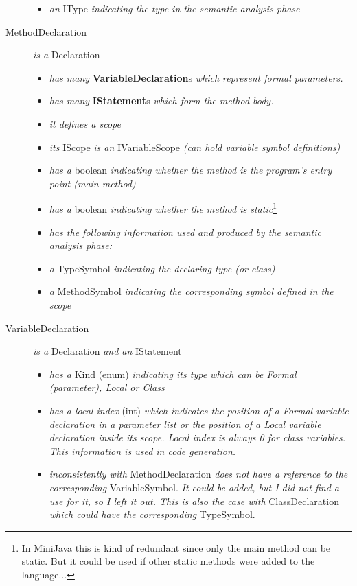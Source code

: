 \documentclass[a4paper,11pt]{article}
\begin{document}
\begin{description}
\begin{itemize}
        \item \emph{an} IType \emph{indicating the type in the semantic analysis phase}
      \end{itemize}
    \item[MethodDeclaration] \emph{is a} Declaration
      \begin{itemize}
        \item \emph{has many} \textbf{VariableDeclaration}s \emph{which represent formal parameters.}
        \item \emph{has many} \textbf{IStatement}s \emph{which form the method body.}
        \item \emph{it defines a scope}
        \item \emph{its} IScope \emph{is an} IVariableScope \emph{(can hold variable symbol definitions)}
        \item \emph{has a} boolean \emph{indicating whether the method is the program's entry point (main method)}
        \item \emph{has a} boolean \emph{indicating whether the method is static}\footnote{In MiniJava this is kind of redundant since only the main method can be static. But it could be used if other static methods were added to the language...}
        \item \emph{has the following information used and produced by the semantic analysis phase:}
        \item \emph{a} TypeSymbol \emph{indicating the declaring type (or class)}
        \item \emph{a} MethodSymbol \emph{indicating the corresponding symbol defined in the scope}
      \end{itemize}
    \item[VariableDeclaration] \emph{is a} Declaration \emph{and an} IStatement
      \begin{itemize}
        \item \emph{has a} Kind (enum) \emph{indicating its type which can be Formal (parameter), Local or Class}
        \item \emph{has a local index} (int) \emph{which indicates the position of a Formal variable declaration in a parameter list or the position of a Local variable declaration inside its scope. Local index is always 0 for class variables. This information is used in code generation.}
        \item \emph{inconsistently with} MethodDeclaration \emph{does not have a reference to the corresponding} VariableSymbol. \emph{It could be added, but I did not find a use for it, so I left it out. This is also the case with} ClassDeclaration \emph{which could have the corresponding} TypeSymbol.

\end{itemize}
\end{description}
\end{document}
